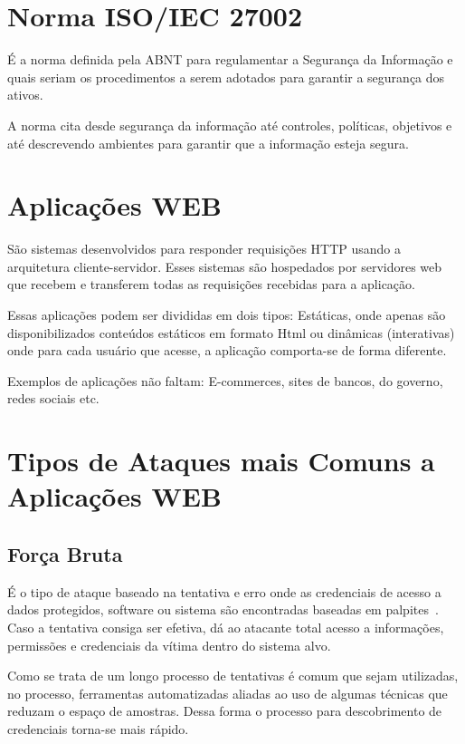 \documentclass[
    12pt,               %
    openright,          %
    oneside,            %
    a4paper,            %
    section=TITLE,     %
    english,            %
    french,             %
    spanish,            %
    brazil              %
    ]{abntex2}
\newcommand{\citep}{\cite}
\begin{document}
\section{Norma ISO/IEC 27002}

É a norma definida pela ABNT para regulamentar a Segurança da Informação e quais seriam os procedimentos a serem adotados para garantir a segurança dos ativos.


A norma cita desde segurança da informação até controles, políticas, objetivos e até descrevendo ambientes para garantir que a informação esteja segura.\citep{62241}



\section{Aplicações WEB}

São sistemas desenvolvidos para responder requisições HTTP usando a arquitetura cliente-servidor. Esses sistemas são hospedados por servidores web que recebem e transferem todas as requisições recebidas para a aplicação.


Essas aplicações podem ser divididas em dois tipos: Estáticas, onde apenas são disponibilizados conteúdos estáticos em formato Html ou dinâmicas (interativas) onde para cada usuário que acesse, a aplicação comporta-se de forma diferente.


Exemplos de aplicações não faltam: E-commerces, sites de bancos, do governo, redes sociais etc.



\section{Tipos de Ataques mais Comuns a Aplicações WEB}


\subsection{Força Bruta}

É o tipo de ataque baseado na tentativa e erro onde as credenciais de acesso a dados protegidos, software ou sistema são encontradas baseadas em palpites\citep{62228}~. Caso a tentativa consiga ser efetiva, dá ao atacante total acesso a informações, permissões e credenciais da vítima dentro do sistema alvo.



Como se trata de um longo processo de tentativas é comum que sejam utilizadas, no processo, ferramentas automatizadas aliadas ao uso de algumas técnicas que reduzam o espaço de amostras. Dessa forma o processo para descobrimento de credenciais torna-se mais rápido.
\end{document}
